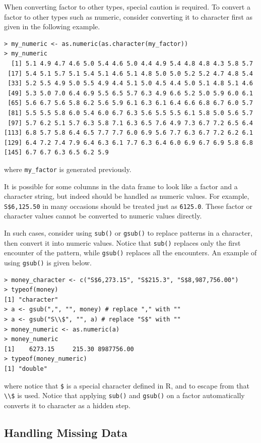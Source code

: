 When converting factor to other types, special caution is required. To convert a factor to other types such as numeric, consider converting it to character first as given in the following example.
\begin{lstlisting}
> my_numeric <- as.numeric(as.character(my_factor))
> my_numeric
  [1] 5.1 4.9 4.7 4.6 5.0 5.4 4.6 5.0 4.4 4.9 5.4 4.8 4.8 4.3 5.8 5.7
 [17] 5.4 5.1 5.7 5.1 5.4 5.1 4.6 5.1 4.8 5.0 5.0 5.2 5.2 4.7 4.8 5.4
 [33] 5.2 5.5 4.9 5.0 5.5 4.9 4.4 5.1 5.0 4.5 4.4 5.0 5.1 4.8 5.1 4.6
 [49] 5.3 5.0 7.0 6.4 6.9 5.5 6.5 5.7 6.3 4.9 6.6 5.2 5.0 5.9 6.0 6.1
 [65] 5.6 6.7 5.6 5.8 6.2 5.6 5.9 6.1 6.3 6.1 6.4 6.6 6.8 6.7 6.0 5.7
 [81] 5.5 5.5 5.8 6.0 5.4 6.0 6.7 6.3 5.6 5.5 5.5 6.1 5.8 5.0 5.6 5.7
 [97] 5.7 6.2 5.1 5.7 6.3 5.8 7.1 6.3 6.5 7.6 4.9 7.3 6.7 7.2 6.5 6.4
[113] 6.8 5.7 5.8 6.4 6.5 7.7 7.7 6.0 6.9 5.6 7.7 6.3 6.7 7.2 6.2 6.1
[129] 6.4 7.2 7.4 7.9 6.4 6.3 6.1 7.7 6.3 6.4 6.0 6.9 6.7 6.9 5.8 6.8
[145] 6.7 6.7 6.3 6.5 6.2 5.9
\end{lstlisting}
where \verb|my_factor| is generated previously.

It is possible for some columns in the data frame to look like a factor and a character string, but indeed should be handled as numeric values. For example, \verb|S$6,125.50| in many occasions should be treated just as \verb|6125.0|. These factor or character values cannot be converted to numeric values directly.

In such cases, consider using \verb|sub()| or \verb|gsub()| to replace patterns in a character, then convert it into numeric values. Notice that \verb|sub()| replaces only the first encounter of the pattern, while \verb|gsub()| replaces all the encounters. An example of using \verb|gsub()| is given below.
\begin{lstlisting}
> money_character <- c("S$6,273.15", "S$215.3", "S$8,987,756.00")
> typeof(money)
[1] "character"
> a <- gsub(",", "", money) # replace "," with ""
> a <- gsub("S\\$", "", a) # replace "S$" with ""
> money_numeric <- as.numeric(a)
> money_numeric
[1]    6273.15     215.30 8987756.00
> typeof(money_numeric)
[1] "double"
\end{lstlisting}
where notice that \verb|$| is a special character defined in R, and to escape from that \verb|\\$| is used. Notice that applying \verb|sub()| and \verb|gsub()| on a factor automatically converts it to character as a hidden step.

\subsection{Handling Missing Data}

